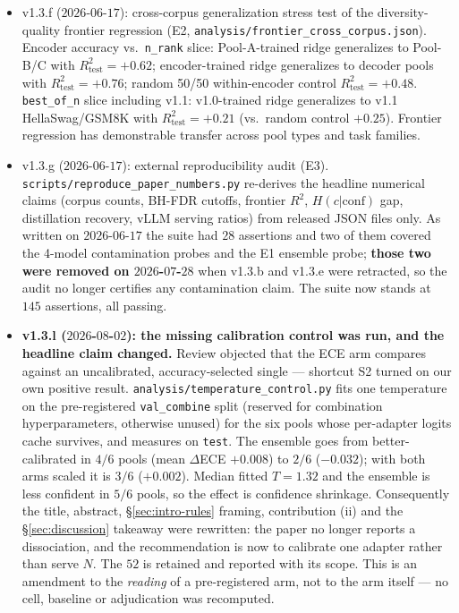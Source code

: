 \documentclass[11pt]{article}
\begin{document}
\begin{itemize}[leftmargin=*]
\item v1.3.f ($2026$-$06$-$17$): cross-corpus generalization stress test of the diversity-quality frontier regression (E2, \texttt{analysis/\allowbreak frontier\_\allowbreak cross\_\allowbreak corpus.\allowbreak json}). Encoder accuracy vs.\ \texttt{n\_rank} slice: Pool-A-trained ridge generalizes to Pool-B/C with $R^2_{\text{test}}{=}{+}0.62$; encoder-trained ridge generalizes to decoder pools with $R^2_{\text{test}}{=}{+}0.76$; random 50/50 within-encoder control $R^2_{\text{test}}{=}{+}0.48$. \texttt{best\_of\_n} slice including v1.1: v1.0-trained ridge generalizes to v1.1 HellaSwag/GSM8K with $R^2_{\text{test}}{=}{+}0.21$ (vs.\ random control $+0.25$). Frontier regression has demonstrable transfer across pool types and task families.
\item v1.3.g ($2026$-$06$-$17$): external reproducibility audit (E3). \texttt{scripts/\allowbreak reproduce\_\allowbreak paper\_\allowbreak numbers.\allowbreak py} re-derives the headline numerical claims (corpus counts, BH-FDR cutoffs, frontier $R^2$, $H(c|\mathrm{conf})$ gap, distillation recovery, vLLM serving ratios) from released JSON files only. As written on $2026$-$06$-$17$ the suite had $28$ assertions and two of them covered the 4-model contamination probes and the E1 ensemble probe; \textbf{those two were removed on $2026$-$07$-$28$} when v1.3.b and v1.3.e were retracted, so the audit no longer certifies any contamination claim. The suite now stands at $145$ assertions, all passing.
\item \textbf{v1.3.l ($2026$-$08$-$02$): the missing calibration control was run, and the headline claim changed.} Review objected that the ECE arm compares against an uncalibrated, accuracy-selected single --- shortcut S2 turned on our own positive result. \texttt{analysis/\allowbreak temperature\_\allowbreak control.\allowbreak py} fits one temperature on the pre-registered \texttt{val\_combine} split (reserved for combination hyperparameters, otherwise unused) for the six pools whose per-adapter logits cache survives, and measures on \texttt{test}. The ensemble goes from better-calibrated in $4/6$ pools (mean $\Delta$ECE ${+}0.008$) to $2/6$ (${-}0.032$); with both arms scaled it is $3/6$ (${+}0.002$). Median fitted $T{=}1.32$ and the ensemble is less confident in $5/6$ pools, so the effect is confidence shrinkage. Consequently the title, abstract, \S\ref{sec:intro-rules} framing, contribution (ii) and the \S\ref{sec:discussion} takeaway were rewritten: the paper no longer reports a dissociation, and the recommendation is now to calibrate one adapter rather than serve $N$. The $52$ is retained and reported with its scope. This is an amendment to the \emph{reading} of a pre-registered arm, not to the arm itself --- no cell, baseline or adjudication was recomputed.

\end{itemize}
\end{document}
